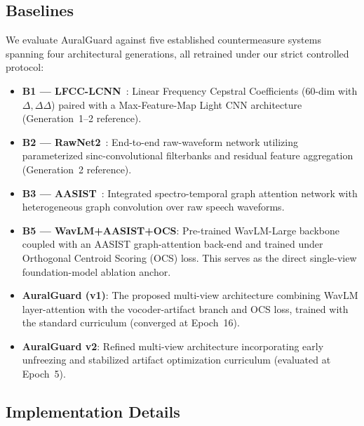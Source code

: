 \subsection{Baselines}
\label{ssec:baselines}

We evaluate AuralGuard against five established countermeasure systems spanning four architectural generations, all retrained under our strict controlled protocol:

\begin{itemize}
    \item \textbf{B1 --- LFCC-LCNN}~\cite{lavrentyeva2019stc}: Linear Frequency Cepstral Coefficients (60-dim with $\Delta,\Delta\Delta$) paired with a Max-Feature-Map Light CNN architecture (Generation~1--2 reference).
    \item \textbf{B2 --- RawNet2}~\cite{tak2021rawnet2}: End-to-end raw-waveform network utilizing parameterized sinc-convolutional filterbanks and residual feature aggregation (Generation~2 reference).
    \item \textbf{B3 --- AASIST}~\cite{jung2022aasist}: Integrated spectro-temporal graph attention network with heterogeneous graph convolution over raw speech waveforms.
    \item \textbf{B5 --- WavLM+AASIST+OCS}: Pre-trained WavLM-Large backbone coupled with an AASIST graph-attention back-end and trained under Orthogonal Centroid Scoring (OCS) loss. This serves as the direct single-view foundation-model ablation anchor.
    \item \textbf{AuralGuard (v1)}: The proposed multi-view architecture combining WavLM layer-attention with the vocoder-artifact branch and OCS loss, trained with the standard curriculum (converged at Epoch~16).
    \item \textbf{AuralGuard v2}: Refined multi-view architecture incorporating early unfreezing and stabilized artifact optimization curriculum (evaluated at Epoch~5).
\end{itemize}

\subsection{Implementation Details}
\label{ssec:implementation}


